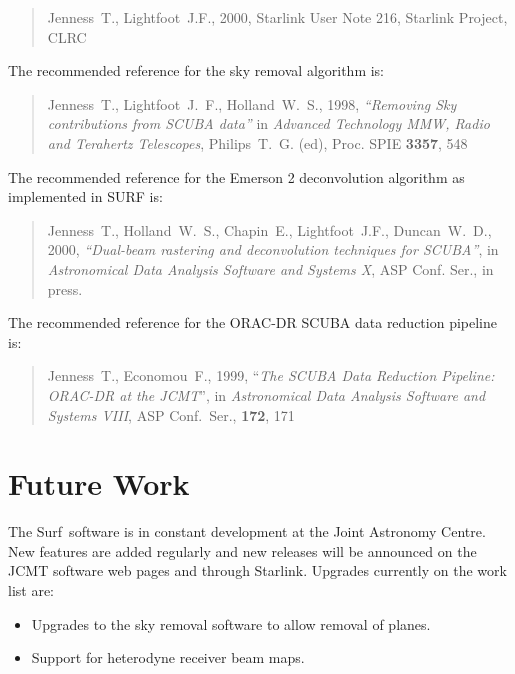 \documentclass[twoside,11pt]{article}
\newcommand{\scusoft}          {{\sc Surf}}
\newcommand{\xlabel}[1]{}
\renewcommand{\_}{\texttt{\symbol{95}}}
\begin{document}
\begin{quote}
Jenness~T., Lightfoot~J.F., 2000, Starlink User Note 216, Starlink
Project, CLRC
\end{quote}

The recommended reference for the sky removal algorithm is:

\begin{quote}
Jenness~T., Lightfoot~J.~F., Holland~W.~S., 1998, 
\textit{``Removing Sky contributions from SCUBA data''} in \textit{Advanced
Technology MMW, Radio and Terahertz Telescopes}, Philips~T.~G. (ed),
Proc. SPIE \textbf{3357}, 548
\end{quote}

The recommended reference for the Emerson 2 deconvolution algorithm
as implemented in SURF is:

\begin{quote}
Jenness~T., Holland~W.~S., Chapin~E., Lightfoot~J.F., Duncan~W.~D., 2000,
\textit{``Dual-beam rastering and deconvolution techniques for SCUBA''}, in
\textit{Astronomical Data Analysis Software and Systems X}, ASP Conf. Ser., in
press.
\end{quote}

The recommended reference for the ORAC-DR SCUBA data reduction pipeline is:

\begin{quote}
Jenness~T., Economou~F.,  1999, ``\textit{The SCUBA Data Reduction Pipeline:
ORAC-DR at the JCMT}'', in \textit{Astronomical Data Analysis Software and
Systems VIII}, ASP Conf.\ Ser., \textbf{172}, 171
\end{quote}


\section{\xlabel{future}Future Work\label{future}}

The \scusoft\ software is in constant development at the
Joint Astronomy Centre. New features are added regularly and new releases
will be announced on the JCMT software web pages and through Starlink.
Upgrades currently on the work list are:

\begin{itemize}

\item Upgrades to the sky removal software to allow removal of planes.

\item Support for heterodyne receiver beam maps.

\end{itemize}
\end{document}
